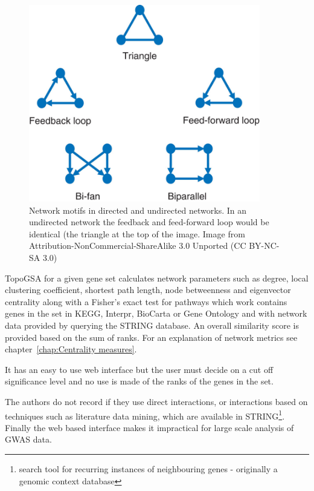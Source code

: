 \begin{figure}
    \centering
    \includegraphics[width=0.9\textwidth]{images/Network-motifs-found-in-biological-networks-The-feed-forward-loop-bi-fan-and-biparallel.png}
    \caption[Network motifs in directed and undirected networks]{Network motifs in directed and undirected networks. In an undirected network the feedback and feed-forward loop would be identical (the triangle at the top of the image. Image from \cite{ngoc2013counting} Attribution-NonCommercial-ShareAlike 3.0 Unported (CC BY-NC-SA 3.0)}
    \label{fig:motifs}
\end{figure}

 TopoGSA \cite{glaab2010topogsa} for a given gene set calculates network parameters such as degree, local clustering coefficient, shortest path length, node betweenness and eigenvector centrality along with a Fisher's exact test for pathways which work contains genes in the set in KEGG, Interpr, BioCarta or Gene Ontology and with network data provided by querying the STRING database\cite{szklarczyk2019string}. An overall similarity score is provided based on the sum of ranks. For an explanation of network metrics see chapter~\ref{chap:Centrality measures}.

It has an easy to use web interface but the user must decide on a cut off significance level and no use is made of the ranks of the genes in the set. 

The authors do not record if they use direct interactions, or interactions based on techniques such as literature data mining, which are available in STRING\footnote{search tool for recurring instances of neighbouring genes - originally a genomic context database}\cite{szklarczyk2019string}. Finally the web based interface makes it impractical for large scale analysis of GWAS data. 

